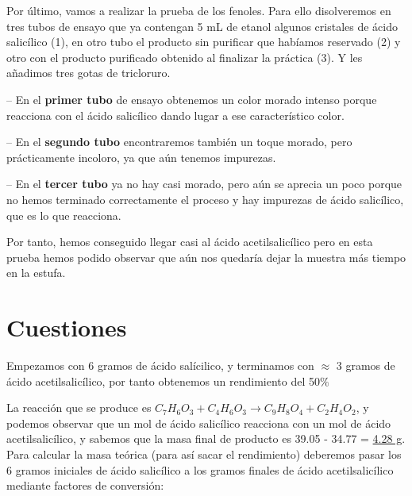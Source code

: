 \vspace{0.3cm}

\noindent Por último, vamos a realizar la prueba de los fenoles. Para ello disolveremos en tres tubos de ensayo que ya contengan 5 mL de etanol algunos cristales de ácido salicílico (1), en otro tubo el producto sin purificar que habíamos reservado (2) y otro con el producto purificado obtenido al finalizar la práctica (3). Y les añadimos tres gotas de tricloruro.

\vspace{0.2cm}

-- En el \textbf{primer tubo} de ensayo obtenemos un color morado intenso porque reacciona con el ácido salicílico dando lugar a ese característico color.

\vspace{0.15cm}

-- En el \textbf{segundo tubo} encontraremos también un toque morado, pero prácticamente incoloro, ya que aún tenemos impurezas.

\vspace{0.15cm}

-- En el \textbf{tercer tubo} ya no hay casi morado, pero aún se aprecia un poco porque no hemos terminado correctamente el proceso y hay impurezas de ácido salicílico, que es lo que reacciona.



\vspace{0.2cm}
\noindent Por tanto, hemos conseguido llegar casi al ácido acetilsalicílico pero en esta prueba hemos podido observar que aún nos quedaría dejar la muestra más tiempo en la estufa.

\clearpage

\section{Cuestiones} 

\noindent Empezamos con 6 gramos de ácido salícilico, y terminamos con $\approx$ 3 gramos de ácido acetilsalicílico, por tanto obtenemos un rendimiento del 50$\%$

\vspace{0.3cm}

\noindent La reacción que se produce es $C_7H_6O_3 + C_4H_6O_3 \rightarrow C_9H_8O_4 + C_2H_4O_2$, y podemos observar que un mol de ácido salicílico reacciona con un mol de ácido acetilsalicílico, y sabemos que la masa final de producto es 39.05 - 34.77 = \underline{4.28 g}. Para calcular la masa teórica (para así sacar el rendimiento) deberemos pasar los 6 gramos iniciales de ácido salicílico a los gramos finales de ácido acetilsalicílico mediante factores de conversión:

